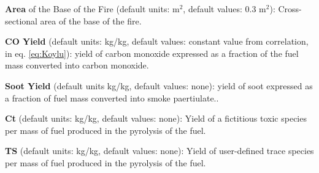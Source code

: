 \textbf{Area} of the Base of the Fire (default units: m$^2$, default values: 0.3 m$^2$): Cross-sectional area of the base of the fire.

\textbf{CO Yield} (default units: kg/kg, default values: constant value from correlation, in eq. \ref{eq:Koylu}): yield of carbon monoxide expressed as a fraction of the fuel mass converted into carbon monoxide.

\textbf{Soot Yield} (default units kg/kg, default values: none): yield of soot expressed as a fraction of fuel mass converted into smoke paertiulate..

\textbf{Ct} (default units: kg/kg, default values: none): Yield of a fictitious toxic species per mass of fuel produced in the pyrolysis of the fuel. 

\textbf{TS} (default units: kg/kg, default values: none): Yield of user-defined trace species per mass of fuel produced in the pyrolysis of the fuel. 

